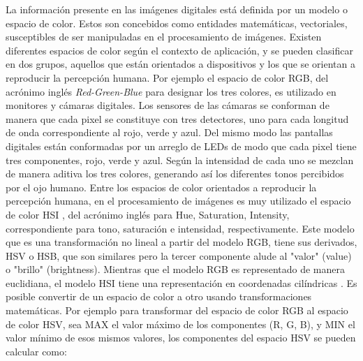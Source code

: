 La información presente en las imágenes digitales está definida por un modelo o espacio de color. Estos son concebidos como entidades matemáticas, vectoriales, susceptibles de ser manipuladas en el procesamiento de imágenes. Existen diferentes espacios de color según el contexto de aplicación, y se pueden clasificar en dos grupos, aquellos que están orientados a dispositivos y los que se orientan a reproducir la percepción humana. Por ejemplo el espacio de color RGB, del acrónimo inglés \textit{Red-Green-Blue} para designar los tres colores, es utilizado en monitores y cámaras digitales. Los sensores de las cámaras se conforman de manera que cada pixel se constituye con tres detectores, uno para cada longitud de onda correspondiente al rojo, verde y azul. Del mismo modo las pantallas digitales están conformadas por un arreglo de LEDs de modo que cada pixel tiene tres componentes, rojo, verde y azul. Según la intensidad de cada uno se mezclan de manera aditiva los tres colores, generando así los diferentes tonos percibidos por el ojo humano.
Entre los espacios de color orientados a reproducir la percepción humana, en el procesamiento de imágenes es muy utilizado el espacio de color HSI \cite{gonzalez_digital_2017}, del acrónimo inglés para Hue, Saturation, Intensity, correspondiente para tono, saturación e intensidad, respectivamente. Este modelo que es una transformación no lineal a partir del modelo RGB, tiene sus derivados, HSV o HSB, que son similares pero la tercer componente alude al "valor" (value) o "brillo" (brightness). Mientras que el modelo RGB es representado de manera euclidiana, el modelo HSI tiene una representación en coordenadas cilíndricas \cite{hanbury_constructing_2008}.
Es posible convertir de un espacio de color a otro usando transformaciones matemáticas. Por ejemplo para transformar del espacio de color RGB al espacio de color HSV, sea MAX el valor máximo de los componentes (R, G, B), y MIN el valor mínimo de esos mismos valores, los componentes del espacio HSV se pueden calcular como:

